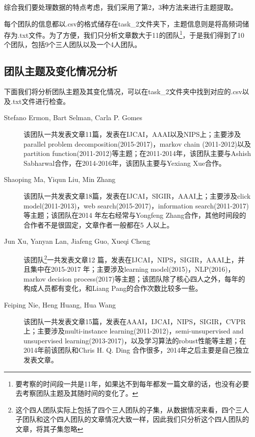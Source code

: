 \documentclass[a4paper,oneside,12pt]{article}
\begin{document}
\begin{spacing}{1.5}
\begin{enumerate}
\end{enumerate}
综合我们要处理数据的特点考虑，我们采用了第2，3种方法来进行主题提取。\par
每个团队的信息都以.csv的格式储存在task\_2文件夹下，主题信息则是将高频词储存为.txt文件。为了方便，我们只分析文章数大于11的团队\footnote{要考察的时间段一共是11年，如果达不到每年都发一篇文章的话，也没有必要去考察团队主题及其随时间的变化了。}，于是我们得到了10个团队，包括9个三人团队以及一个4人团队。

\subsection{团队主题及变化情况分析}
下面我们将分析团队主题及其变化情况，可以在task\_2文件夹中找到对应的.csv以及.txt文件进行检查。

\begin{description}

  \item[Stefano Ermon, Bart Selman, Carla P. Gomes] 该团队一共发表文章11篇，发表在IJCAI，AAAI以及NIPS上；主要涉及parallel problem decomposition(2015-2017)，markov chain (2011-2012)以及partition function(2011-2012)等主题；在2011-2014年，该团队主要与Ashish Sabharwal合作，在2014-2016年，该团队主要与Yexiang Xue合作。
  
  \item[Shaoping Ma, Yiqun Liu, Min Zhang] 该团队一共发表文章18篇，发表在IJCAI，SIGIR，AAAI上；主要涉及click model(2011-2013)，web search(2015-2017)，information search(2011-2017)等主题；该团队在2014 年左右经常与Yongfeng Zhang合作，其他时间段的合作者不是很固定，文章作者一般都在5 人以上。
  
  \item[Jun Xu, Yanyan Lan, Jiafeng Guo, Xueqi Cheng] 该团队\footnote{这个四人团队实际上包括了四个三人团队的子集，从数据情况来看，四个三人子团队和这个四人团队的文章情况大致一样，因此我们只分析这个四人团队的文章，将其子集忽略}一共发表文章12 篇，发表在IJCAI，NIPS，SIGIR，AAAI上，并且集中在2015-2017 年；主要涉及learning model(2015)，NLP(2016)，markov decision process(2017)等主题；该团队除了核心四人之外，每年的构成人员都有变化，和Liang Pang的合作次数比较多一些。
  
  \item[Feiping Nie, Heng Huang, Hua Wang]该团队一共发表文章15篇，发表在AAAI，IJCAI，NIPS，SIGIR，CVPR上；主要涉及multi-instance learning(2011-2012)，semi-unsupervised and unsupervised learning(2013-2017)，以及学习算法的robust性能等主题；在2014年前该团队和Chris H. Q. Ding 合作很多，2014年之后主要是自己独立发表文章。


\end{description}
\end{spacing}
\end{document}
